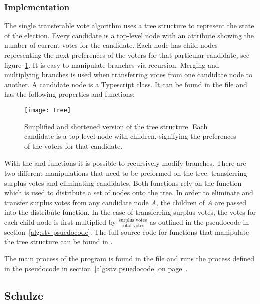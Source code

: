 \documentclass[12pt]{article}
\begin{document}
\subsubsection{Implementation}
The single transferable vote algorithm uses a tree structure to represent the state of the election. Every candidate is a top-level node with an attribute showing the number of current votes for the candidate. Each node has child nodes representing the next preferences of the voters for that particular candidate, see figure~\ref{fig:tree structure}. It is easy to manipulate branches via recursion. Merging and multiplying branches is used when transferring votes from one candidate node to another. A candidate node is a Typescript class. It can be found in the  file and has the following properties and functions:
\begin{figure}
	\centering
	\texttt{[image: Tree]}
	\caption{Simplified and shortened version of the tree structure. Each candidate is a top-level node with children, signifying the preferences of the voters for that candidate.}
\label{fig:tree structure}
\end{figure}
With the  and  functions it is possible to recursively modify branches. There are two different manipulations that need to be preformed on the tree: transferring surplus votes and eliminating candidates. Both functions rely on the  function which is used to distribute a set of nodes onto the tree.
In order to eliminate and transfer surplus votes from any candidate node $A$, the children of $A$ are passed into the distribute function. In the case of transferring surplus votes, the votes for each child node is first multiplied by $\frac{\text{surplus votes}}{\text{total votes}}$ as outlined in the pseudocode in section~\ref{alg:stv psuedocode}. The full source code for functions that manipulate the tree structure can be found in .

The main process of the program is found in the  file and runs the process defined in the pseudocode in section~\ref{alg:stv psuedocode} on page~\pageref{alg:stv psuedocode}.

\subsection{Schulze}
\end{document}
